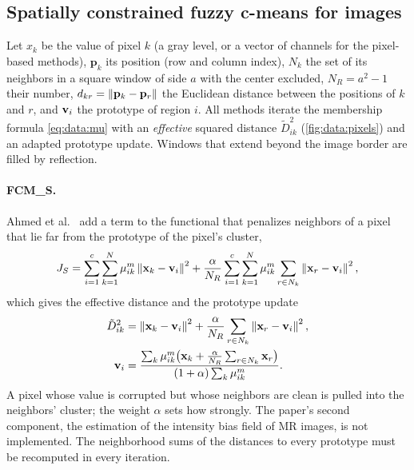 \subsection{Spatially constrained fuzzy c-means for images}\label{sec:data:image}

Let $x_k$ be the value of pixel $k$ (a gray level, or a vector of channels for the pixel-based methods), $\mathbf{p}_k$ its position (row and column index), $N_k$ the set of its neighbors in a square window of side $a$ with the center excluded, $N_R=a^2-1$ their number, $d_{kr}=\left\lVert \mathbf{p}_k-\mathbf{p}_r \right\rVert$ the Euclidean distance between the positions of $k$ and $r$, and $\mathbf{v}_i$ the prototype of region $i$. All methods iterate the membership formula \eqref{eq:data:mu} with an \emph{effective} squared distance $\tilde D^2_{ik}$ (\cref{fig:data:pixels}) and an adapted prototype update. Windows that extend beyond the image border are filled by reflection.

\paragraph{FCM\_S.} Ahmed et al.\ \cite{ahmed:2002:fcms} add a term to the functional that penalizes neighbors of a pixel that lie far from the prototype of the pixel's cluster,
\begin{equation}
  J_{S}=\sum_{i=1}^{c}\sum_{k=1}^{N}\mu_{ik}^m\left\lVert \mathbf{x}_k-\mathbf{v}_i \right\rVert^2+\frac{\alpha}{N_R}\sum_{i=1}^{c}\sum_{k=1}^{N}\mu_{ik}^m\sum_{r\in N_k}\left\lVert \mathbf{x}_r-\mathbf{v}_i \right\rVert^2 ,
  \label{eq:data:fcms}
\end{equation}
which gives the effective distance and the prototype update
\begin{equation}
  \begin{aligned}
  \tilde D^2_{ik}&=\left\lVert \mathbf{x}_k-\mathbf{v}_i \right\rVert^2+\frac{\alpha}{N_R}\sum_{r\in N_k}\left\lVert \mathbf{x}_r-\mathbf{v}_i \right\rVert^2,\\
  \mathbf{v}_i&=\frac{\sum_k\mu_{ik}^m\big(\mathbf{x}_k+\frac{\alpha}{N_R}\sum_{r\in N_k}\mathbf{x}_r\big)}{(1+\alpha)\sum_k\mu_{ik}^m} .
  \end{aligned}
  \label{eq:data:fcmsupd}
\end{equation}
A pixel whose value is corrupted but whose neighbors are clean is pulled into the neighbors' cluster; the weight $\alpha$ sets how strongly. The paper's second component, the estimation of the intensity bias field of MR images, is not implemented. The neighborhood sums of the distances to every prototype must be recomputed in every iteration.

